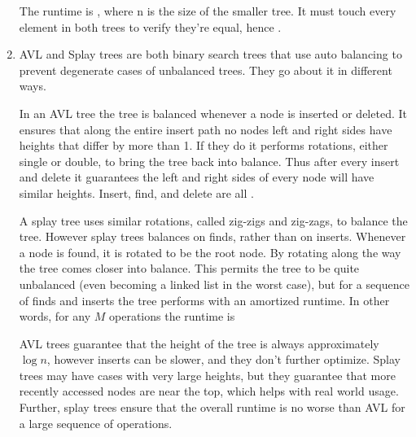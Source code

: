 \documentclass[12pt]{chmullighw}
\begin{document}
\begin{enumerate}
\begin{algorithm}[H]
\SetAlgoNoLine
{}

\end{algorithm}

The runtime is , where n is the size of the smaller tree. It must touch
every element in both trees to verify they're equal, hence .

\item AVL and Splay trees are both binary search trees that use auto balancing to
prevent degenerate cases of unbalanced trees. They go about it in different ways.

In an AVL tree the tree is balanced whenever a node is inserted or deleted. It
ensures that along the entire insert path no nodes left and right sides have
heights that differ by more than 1. If they do it performs rotations, either single
or double, to bring the tree back into balance. Thus after every insert and delete
it guarantees the left and right sides of every node will have similar heights.
Insert, find, and delete are all . 

A splay tree uses similar rotations, called zig-zigs and zig-zags, to balance the
tree. However splay trees balances on finds, rather than on inserts. Whenever a
node is found, it is rotated to be the root node. By rotating along the way the
tree comes closer into balance. This permits the tree to be quite unbalanced
(even becoming a linked list in the worst case), but for a sequence of finds
and inserts the tree performs with an amortized  runtime. In other
words, for any $M$ operations the runtime is 

AVL trees guarantee that the height of the tree is always approximately $\log n$,
however inserts can be slower, and they don't further optimize. Splay trees may
have cases with very large heights, but they guarantee that more recently accessed
nodes are near the top, which helps with real world usage. Further, splay trees
ensure that the overall runtime is no worse than AVL for a large sequence of
operations.

\end{enumerate} %
\end{document}
